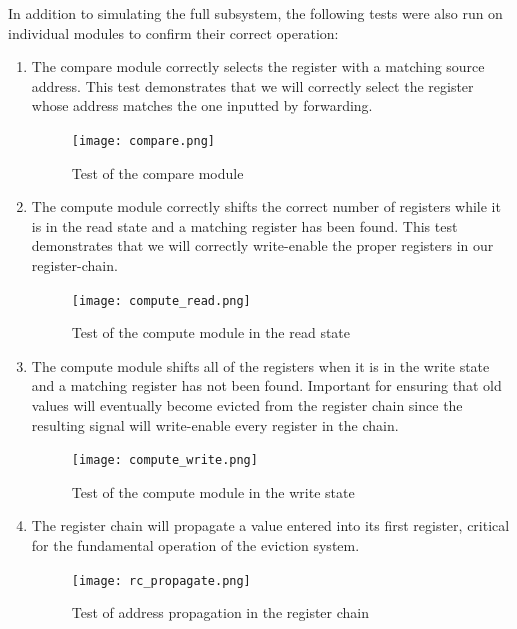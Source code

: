 \documentclass{article}
\begin{document}
In addition to simulating the full subsystem, the following tests were also run on individual modules to confirm their correct operation:
\begin{enumerate}
\item The compare module correctly selects the register with a matching source address. This test demonstrates that we will correctly select the register whose address matches the one inputted by forwarding.

\begin{figure}[ht!]
  \centering
  	\texttt{[image: compare.png]}
  \caption{Test of the compare module}
  \label{fig:eviction}
\end{figure}

\item The compute module correctly shifts the correct number of registers while it is in the read state and a matching register has been found. This test demonstrates that we will correctly write-enable the proper registers in our register-chain.

\begin{figure}[ht!]
  \centering
  	\texttt{[image: compute\_read.png]}
  \caption{Test of the compute module in the read state}
  \label{fig:compute_read}
\end{figure}

\newpage

\item The compute module shifts all of the registers when it is in the write state and a matching register has not been found. Important for ensuring that old values will eventually become evicted from the register chain since the resulting signal will write-enable every register in the chain.

\begin{figure}[ht!]
  \centering
  	\texttt{[image: compute\_write.png]}
  \caption{Test of the compute module in the write state}
  \label{fig:compute_write}
\end{figure}

\item The register chain will propagate a value entered into its first register, critical for the fundamental operation of the eviction system.

\begin{figure}[ht!]
  \centering
  	\texttt{[image: rc\_propagate.png]}
  \caption{Test of address propagation in the register chain}
  \label{fig:rc_propagate}
\end{figure}

\end{enumerate}
\end{document}
